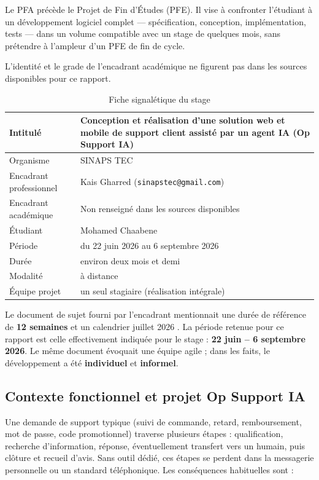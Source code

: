 Le PFA précède le Projet de Fin d'Études (PFE). Il vise à confronter l'étudiant à un développement logiciel complet --- spécification, conception, implémentation, tests --- dans un volume compatible avec un stage de quelques mois, sans prétendre à l'ampleur d'un PFE de fin de cycle.

L'identité et le grade de l'encadrant académique ne figurent pas dans les sources disponibles pour ce rapport.

\begin{table}[H]
\centering
\caption{Fiche signalétique du stage}
\label{tab:fiche-stage}
\begin{tabularx}{\textwidth}{|l|X|}
\hline
\textbf{Intitulé} & Conception et réalisation d'une solution web et mobile de support client assisté par un agent IA (Op Support IA) \\
\hline
Organisme & SINAPS TEC \\
\hline
Encadrant professionnel & Kais Gharred (\texttt{sinapstec@gmail.com}) \\
\hline
Encadrant académique & Non renseigné dans les sources disponibles \\
\hline
Étudiant & Mohamed Chaabene \\
\hline
Période & du 22 juin 2026 au 6 septembre 2026 \\
\hline
Durée & environ deux mois et demi \\
\hline
Modalité & à distance \\
\hline
Équipe projet & un seul stagiaire (réalisation intégrale) \\
\hline
\end{tabularx}
\end{table}

Le document de sujet fourni par l'encadrant mentionnait une durée de référence de \textbf{12 semaines} et un calendrier \og juillet 2026 \fg{}. La période retenue pour ce rapport est celle effectivement indiquée pour le stage : \textbf{22 juin -- 6 septembre 2026}. Le même document évoquait une \og équipe agile \fg{} ; dans les faits, le développement a été \textbf{individuel} et \textbf{informel}.

\subsection{Contexte fonctionnel et projet Op Support IA}

Une demande de support typique (suivi de commande, retard, remboursement, mot de passe, code promotionnel) traverse plusieurs étapes : qualification, recherche d'information, réponse, éventuellement transfert vers un humain, puis clôture et recueil d'avis. Sans outil dédié, ces étapes se perdent dans la messagerie personnelle ou un standard téléphonique. Les conséquences habituelles sont :

